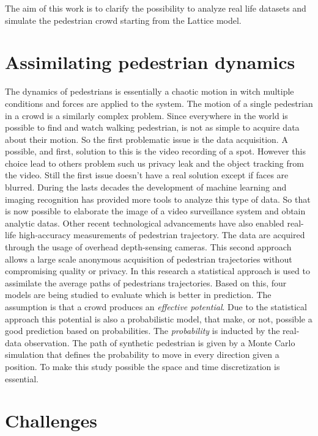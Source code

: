 \documentclass[class=article, crop=false]{standalone}
\begin{document}
The aim of this work is to clarify the possibility to analyze real life datasets and simulate the pedestrian crowd starting from the Lattice model.

\section{Assimilating pedestrian dynamics}
The dynamics of pedestrians is essentially a chaotic motion in witch multiple conditions and forces are applied to the system.
The motion of a single pedestrian in a crowd is a similarly complex problem.
Since everywhere in the world is possible to find and watch walking pedestrian, is not as simple to acquire data about their motion.
So the first problematic issue is the data acquisition.
A possible, and first, solution to this is the video recording of a spot.
However this choice lead to others problem such us privacy leak and the object tracking from the video.
Still the first issue doesn't have a real solution except if faces are blurred.
During the lasts decades the development of machine learning and imaging recognition has provided more tools to analyze this type of data.
So that is now possible to elaborate the image of a video surveillance system and obtain analytic datas.
Other recent technological advancements have also enabled real-life high-accuracy measurements of pedestrian trajectory.
The data are acquired through the usage of overhead depth-sensing cameras.
This second approach allows a large scale anonymous acquisition of pedestrian trajectories without compromising quality or privacy.
In this research a statistical approach is used to assimilate the average paths of pedestrians trajectories.
Based on this, four models are being studied to evaluate which is better in prediction.
The assumption is that a crowd produces an \emph{effective potential}. 
Due to the statistical approach this potential is also a probabilistic model, that make, or not, possible a good prediction based on probabilities.
The \emph{probability} is inducted by the real-data observation.
The path of synthetic pedestrian is given by a Monte Carlo simulation that defines the probability to move in every direction given a position.
To make this study possible the space and time discretization is essential.



\section{Challenges}
\end{document}
